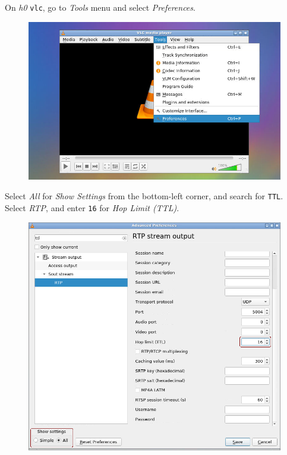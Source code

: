 \documentclass{../UTNetLab}
\begin{document}
On \textit{h0} \lstinline{vlc}, go to \textit{Tools} menu and select \textit{Preferences}.
\begin{figure}[H]
    \centering
    \includegraphics[scale=2]{img/open-pref}
\end{figure}
Select \textit{All} for \textit{Show Settings} from the bottom-left corner,
and search for \texttt{TTL}.
Select \textit{RTP},
and enter \texttt{16} for \textit{Hop Limit (TTL)}.
\begin{figure}[H]
    \centering
    \includegraphics[scale=2.2]{img/pref}
\end{figure}
\end{document}
